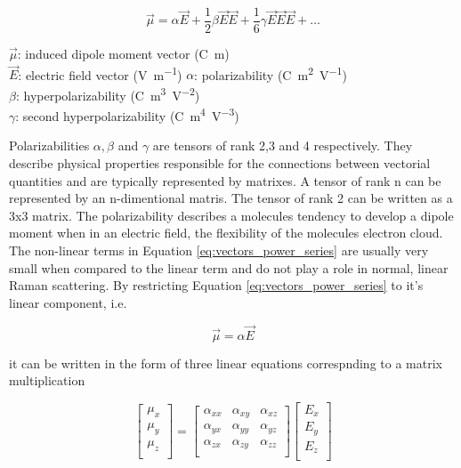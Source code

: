 \begin{equation} \label{eq:vectors_power_series}
    \overrightarrow{\mu} = \alpha \overrightarrow{E} + \frac{1}{2} \beta \overrightarrow{E}\overrightarrow{E} + \frac{1}{6} \gamma \overrightarrow{E}\overrightarrow{E}\overrightarrow{E} + \dots
\end{equation}

\(\overrightarrow{\mu} \): induced dipole moment vector (\unit{\coulomb\meter})\\
\(\overrightarrow{E} \): electric field vector (\unit{\volt\per\meter})
\(\alpha\): polarizability (\unit{\coulomb\meter\squared\per\volt}) \\
\(\beta\): hyperpolarizability (\unit{\coulomb\meter\cubed\per\volt\squared}) \\
\(\gamma\): second hyperpolarizability (\unit{\coulomb\meter^4\volt^{-3}}) 

\bigskip

Polarizabilities \( \alpha, \beta\) and \( \gamma\) are tensors of rank 2,3 and 4 respectively. They describe physical properties responsible for the connections between vectorial quantities and are typically represented by matrixes. A tensor of rank n can be represented by an n-dimentional matris. The tensor of rank 2 can be written as a 3x3 matrix. The polarizability describes a molecules tendency to develop a dipole moment when in an electric field, the flexibility of the molecules electron cloud. The non-linear terms in Equation \ref{eq:vectors_power_series} are usually very small when compared to the linear term and do not play a role in normal, linear Raman scattering. By restricting Equation \ref{eq:vectors_power_series} to it's linear component, i.e.


\begin{equation} \label{eq:vectors_power_series_lin}
    \overrightarrow{\mu} = \alpha \overrightarrow{E}
\end{equation}

it can be written in the form of three linear equations correspnding to a matrix multiplication

\begin{equation}
    \begin{bmatrix}
        \mu_x\\
        \mu_y\\
        \mu_z\\
    \end{bmatrix}
    = 
    \begin{bmatrix}
        \alpha_{xx} & \alpha_{xy} & \alpha_{xz} \\
        \alpha_{yx} & \alpha_{yy} & \alpha_{yz}\\
        \alpha_{zx} & \alpha_{zy} & \alpha_{zz}\\
    \end{bmatrix}
    \begin{bmatrix}
        E_x\\
        E_y\\
        E_z\\
    \end{bmatrix}
\end{equation}

